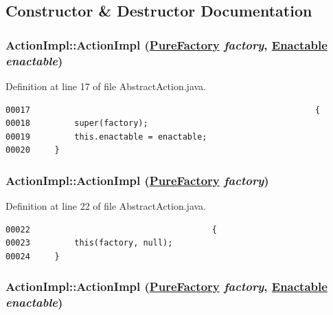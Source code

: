 \subsection{Constructor \& Destructor Documentation}
\hypertarget{classActionImpl_c0}{
\subsubsection[ActionImpl]{\setlength{\rightskip}{0pt plus 5cm}Action\-Impl::Action\-Impl (\hyperlink{classPureFactory}{Pure\-Factory} {\em factory}, \hyperlink{interfaceEnactable}{Enactable} {\em enactable})}}
\label{classActionImpl_c0}




Definition at line 17 of file Abstract\-Action.java.\footnotesize\begin{verbatim}00017                                                          {
00018         super(factory);
00019         this.enactable = enactable;
00020     }
\end{verbatim}\normalsize 
\hypertarget{classActionImpl_c1}{
\subsubsection[ActionImpl]{\setlength{\rightskip}{0pt plus 5cm}Action\-Impl::Action\-Impl (\hyperlink{classPureFactory}{Pure\-Factory} {\em factory})}}
\label{classActionImpl_c1}




Definition at line 22 of file Abstract\-Action.java.\footnotesize\begin{verbatim}00022                                     {
00023         this(factory, null);
00024     }
\end{verbatim}\normalsize 
\hypertarget{classActionImpl_c2}{
\subsubsection[ActionImpl]{\setlength{\rightskip}{0pt plus 5cm}Action\-Impl::Action\-Impl (\hyperlink{classPureFactory}{Pure\-Factory} {\em factory}, \hyperlink{interfaceEnactable}{Enactable} {\em enactable})}}
\label{classActionImpl_c2}




